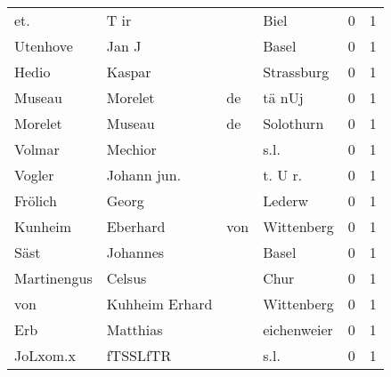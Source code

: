 \begin{center}
\begin{tiny}
\begin{longtabu}{llllrr}
                      et. &                               T ir &             &                                        Biel &          0 &         1 \\
                 Utenhove &                              Jan J &             &                                       Basel &          0 &         1 \\
                    Hedio &                             Kaspar &             &                                  Strassburg &          0 &         1 \\
                   Museau &                            Morelet &          de &                                      tä nUj &          0 &         1 \\
                  Morelet &                             Museau &          de &                                   Solothurn &          0 &         1 \\
                   Volmar &                            Mechior &             &                                        s.l. &          0 &         1 \\
                   Vogler &                        Johann jun. &             &                                    t. U r.  &          0 &         1 \\
                  Frölich &                              Georg &             &                                      Lederw &          0 &         1 \\
                  Kunheim &                           Eberhard &         von &                                  Wittenberg &          0 &         1 \\
                     Säst &                           Johannes &             &                                       Basel &          0 &         1 \\
              Martinengus &                             Celsus &             &                                        Chur &          0 &         1 \\
                      von &                     Kuhheim Erhard &             &                                  Wittenberg &          0 &         1 \\
                      Erb &                           Matthias &             &                                 eichenweier &          0 &         1 \\
                 JoLxom.x &                           fTSSLfTR &             &                                        s.l. &          0 &         1 \\

\end{longtabu}
\end{tiny}
\end{center}
